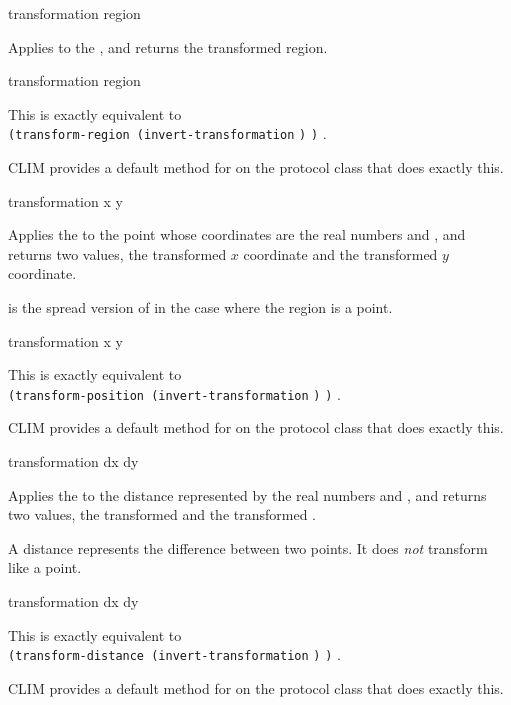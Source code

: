  {transformation region}

Applies  to the  , and returns the
transformed region.

 {transformation region}

This is exactly equivalent to \\
\verb+(transform-region (invert-transformation+ \verb+)+
\verb+)+ .

CLIM provides a default method for  on the
 protocol class that does exactly this.


 {transformation x y}

Applies the   to the point whose
coordinates are the real numbers  and , and returns two values,
the transformed $x$ coordinate and the transformed $y$ coordinate.

 is the spread version of  in the
case where the region is a point.

 {transformation x y}

This is exactly equivalent to \\
\verb+(transform-position (invert-transformation+ \verb+)+
 \verb+)+ .

CLIM provides a default method for  on the
 protocol class that does exactly this.


 {transformation dx dy}

Applies the   to the distance
represented by the real numbers  and , and returns two values,
the transformed  and the transformed .

A distance represents the difference between two points.  It does {\sl not}
transform like a point.

 {transformation dx dy} 

This is exactly equivalent to \\
\verb+(transform-distance (invert-transformation+ \verb+)+
 \verb+)+ .

CLIM provides a default method for  on the
 protocol class that does exactly this.


